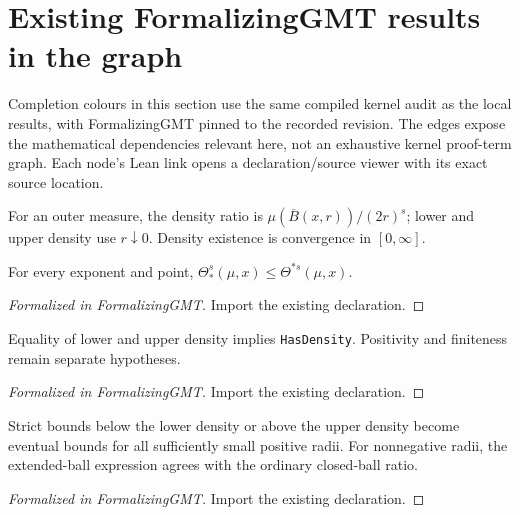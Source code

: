 \section{Existing FormalizingGMT results in the graph}
Completion colours in this section use the same compiled kernel audit as the
local results, with FormalizingGMT pinned to the recorded revision. The edges expose the
mathematical dependencies relevant here, not an exhaustive kernel proof-term graph.
Each node's Lean link opens a declaration/source viewer with its exact source location.

\begin{definition}
\label{def:density-api}
\leanok
For an outer measure, the density ratio is $\mu(\overline B(x,r))/(2r)^s$; lower and upper density use $r\downarrow0$. Density existence is convergence in $[0,\infty]$.
\end{definition}

\begin{lemma}
\label{gmt:density-order}
\leanok
{}
For every exponent and point, $\Theta_*^s(\mu,x)\leq\Theta^{*s}(\mu,x)$.
\end{lemma}
\begin{proof}[Formalized in FormalizingGMT]
\leanok
Import the existing declaration.
\end{proof}

\begin{lemma}
\label{gmt:density-limit}
\leanok
{}
Equality of lower and upper density implies \texttt{HasDensity}. Positivity and finiteness remain separate hypotheses.
\end{lemma}
\begin{proof}[Formalized in FormalizingGMT]
\leanok
Import the existing declaration.
\end{proof}

\begin{lemma}
\label{gmt:density-bounds}
\leanok
{}
Strict bounds below the lower density or above the upper density become eventual bounds for all sufficiently small positive radii. For nonnegative radii, the extended-ball expression agrees with the ordinary closed-ball ratio.
\end{lemma}
\begin{proof}[Formalized in FormalizingGMT]
\leanok
Import the existing declaration.
\end{proof}

